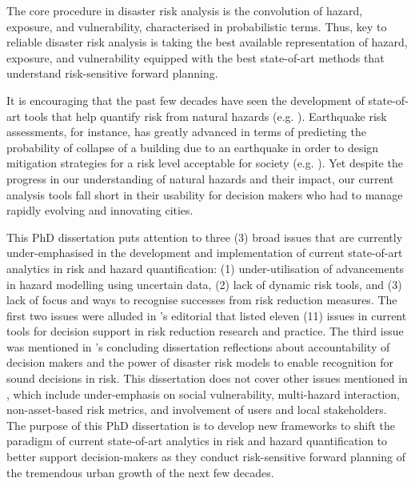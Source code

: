 The core procedure in disaster risk analysis is the convolution of hazard, exposure, and vulnerability, characterised in probabilistic terms. Thus, key to reliable disaster risk analysis is taking the best available representation of hazard, exposure, and vulnerability equipped with the best state-of-art methods that understand risk-sensitive forward planning.

It is encouraging that the past few decades have seen the development of state-of-art tools that help quantify risk from natural hazards (e.g. \citet{tralli2005satellite, liel2009incorporating, yun2015rapid, loos2020g}). Earthquake risk assessments, for instance, has greatly advanced in terms of predicting the probability of collapse of a building due to an earthquake in order to design mitigation strategies for a risk level acceptable for society (e.g. \citet{krawinkler2004performance,liel2006effectiveness, liel2008assessing, liel2012using}).  Yet despite the progress in our understanding of natural hazards and their impact, our current analysis tools fall short in their usability for decision makers who had to manage rapidly evolving and innovating cities. 

This PhD dissertation puts attention to three (3) broad issues that are currently under-emphasised in the development and implementation of current state-of-art analytics in risk and hazard quantification: (1) under-utilisation of advancements in hazard modelling using uncertain data, (2) lack of dynamic risk tools, and (3) lack of focus and ways to recognise successes from risk reduction measures. The first two issues were alluded in \cite{galasso2021risk}'s editorial that listed eleven (11) issues in current tools for decision support in risk reduction research and practice. The third issue was mentioned in \cite{lallemant2015modeling}'s concluding dissertation reflections about accountability of decision makers and the power of disaster risk models to enable recognition for sound decisions in risk. This dissertation does not cover other issues mentioned in \cite{galasso2021risk}, which include under-emphasis on social vulnerability, multi-hazard interaction, non-asset-based risk metrics, and involvement of users and local stakeholders. The purpose of this PhD dissertation is to develop new frameworks to shift the paradigm of current state-of-art analytics in risk and hazard quantification to better support decision-makers as they conduct risk-sensitive forward planning of the tremendous urban growth of the next few decades.

